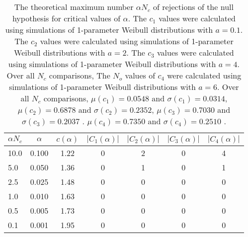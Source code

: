 \begin{table}[h!]
\begin{center}
\begin{tabular}{| l | c | c | c | c | c | c |}\hline
$\alpha N_c$ & $\alpha$ & $c(\alpha)$ & $|C_1(\alpha)|$ & $|C_2(\alpha)|$ & $|C_3(\alpha)|$ & $|C_4(\alpha)|$ \\\hline
10.0 & 0.100 & 1.22 & 0 & 2 & 0 & 4 \\\hline
5.0 & 0.050 & 1.36 & 0 & 1 & 0 & 1 \\\hline
2.5 & 0.025 & 1.48 & 0 & 0 & 0 & 0 \\\hline
1.0 & 0.010 & 1.63 & 0 & 0 & 0 & 0 \\\hline
0.5 & 0.005 & 1.73 & 0 & 0 & 0 & 0 \\\hline
0.1 & 0.001 & 1.95 & 0 & 0 & 0 & 0 \\\hline
\end{tabular}
\caption{The theoretical maximum number $\alpha N_c$ of rejections
of the null hypothesis for critical values of $\alpha$.
The $c_1$ values were calculated using simulations of 1-parameter Weibull distributions with $a=0.1$.
The $c_2$ values were calculated using simulations of 1-parameter Weibull distributions with $a=2$.
The $c_3$ values were calculated using simulations of 1-parameter Weibull distributions with $a=4$.
Over all $N_c$ comparisons,
The $N_o$ values of $c_4$ were calculated using simulations of
 1-parameter Weibull distributions with $a=6$.
Over all $N_c$ comparisons,
 $\mu(c_1)=0.0548$ and $\sigma(c_1)=0.0314$,
 $\mu(c_2)=0.6878$ and $\sigma(c_2)=0.2352$,
 $\mu(c_3)=0.7030$ and $\sigma(c_3)=0.2037$ .
 $\mu(c_4)=0.7350$ and $\sigma(c_4)=0.2510$ .
}
\end{center}
\end{table}